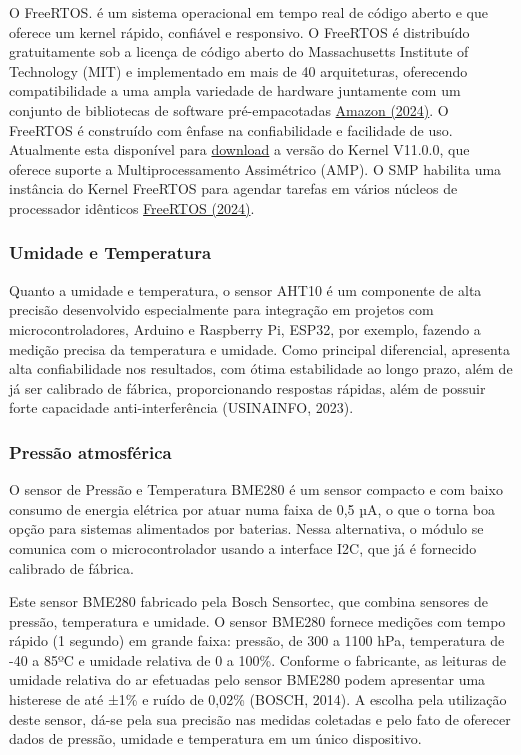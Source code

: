 \documentclass[%
  article,%
  a4paper,%
  12pt,%
  fleqn,%
  oneside,%
  chapter = TITLE,%
  section = TITLE,%
]{abntex2}
\begin{document}
O FreeRTOS. é um sistema operacional em tempo real de código aberto e  que oferece um kernel rápido, confiável e responsivo. O FreeRTOS é distribuído gratuitamente sob a licença de código aberto do Massachusetts Institute of Technology (MIT) e implementado em mais de 40 arquiteturas, oferecendo compatibilidade a uma ampla variedade de hardware juntamente com um conjunto de bibliotecas de software pré-empacotadas \href{https://aws.amazon.com/pt/freertos/}{Amazon (2024)}. O FreeRTOS é construído com ênfase na confiabilidade e facilidade de uso. Atualmente esta disponível para \href{https://github.com/FreeRTOS/FreeRTOS-Kernel/releases/tag/V11.0.0}{download} a versão do Kernel V11.0.0, que oferece suporte a Multiprocessamento Assimétrico (AMP). O SMP habilita uma instância do Kernel FreeRTOS para agendar tarefas em vários núcleos de processador idênticos \href{https://www.freertos.org/2023/12/introducing-freertos-kernel-version-11-0-0-a-major-release-with-symmetric-multiprocessing-smp-support.html}{FreeRTOS (2024)}.

\subsubsection{Umidade e Temperatura }

Quanto a umidade e temperatura, o sensor AHT10 é um componente de alta precisão desenvolvido especialmente para integração em projetos com microcontroladores, Arduino e Raspberry Pi, ESP32, por exemplo, fazendo a medição precisa da temperatura e umidade. Como principal diferencial, apresenta alta confiabilidade nos resultados, com ótima estabilidade ao longo prazo, além de já ser calibrado de fábrica, proporcionando respostas rápidas, além de possuir forte capacidade anti-interferência (USINAINFO, 2023).

\subsubsection{Pressão atmosférica }

O sensor de Pressão e Temperatura BME280 é um sensor compacto e com baixo consumo de energia elétrica por atuar numa faixa de 0,5 µA, o que o torna boa opção para sistemas alimentados por baterias. Nessa alternativa, o módulo se comunica com o microcontrolador usando a interface I2C, que já é fornecido calibrado de fábrica. 

Este sensor BME280 fabricado pela Bosch Sensortec, que combina sensores de pressão, temperatura e umidade. O sensor BME280 fornece medições com tempo rápido (1 segundo) em grande faixa: pressão, de 300 a 1100 hPa, temperatura de -40 a 85ºC e umidade relativa de 0 a 100\%.  Conforme o fabricante, as leituras de umidade relativa do ar efetuadas pelo sensor BME280 podem apresentar uma histerese de até ±1\% e ruído de 0,02\% (BOSCH, 2014).
A escolha pela utilização deste sensor, dá-se pela sua precisão nas medidas coletadas e pelo fato de oferecer dados de pressão, umidade e temperatura em um único dispositivo.
\end{document}

